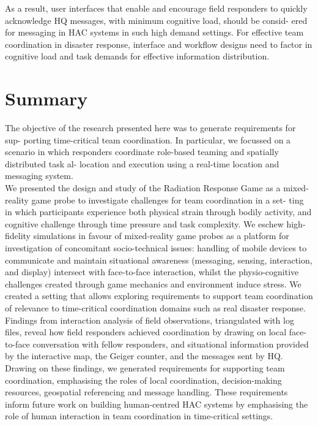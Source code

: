 As a result, user interfaces that enable and encourage field responders to quickly acknowledge HQ messages, with minimum cognitive load, should be consid- ered for messaging in HAC systems in such high demand settings. For effective team coordination in disaster response, interface and workflow designs need to factor in cognitive load and task demands for effective information distribution.\\


\section{Summary}
The objective of the research presented here was to generate requirements for sup- porting time-critical team coordination. In particular, we focussed on a scenario in which responders coordinate role-based teaming and spatially distributed task al- location and execution using a real-time location and messaging system.\\

We presented the design and study of the Radiation Response Game as a mixed-reality game probe to investigate challenges for team coordination in a set- ting in which participants experience both physical strain through bodily activity, and cognitive challenge through time pressure and task complexity. We eschew high-fidelity simulations in favour of mixed-reality game probes as a platform for investigation of concomitant socio-technical issues: handling of mobile devices to communicate and maintain situational awareness (messaging, sensing, interaction, and display) intersect with face-to-face interaction, whilst the physio-cognitive challenges created through game mechanics and environment induce stress. We created a setting that allows exploring requirements to support team coordination of relevance to time-critical coordination domains such as real disaster response.\\

Findings from interaction analysis of field observations, triangulated with log files, reveal how field responders achieved coordination by drawing on local face-to-face conversation with fellow responders, and situational information provided by the interactive map, the Geiger counter, and the messages sent by HQ. Drawing on these findings, we generated requirements for supporting team coordination, emphasising the roles of local coordination, decision-making resources, geospatial referencing and message handling. These requirements inform future work on building human-centred HAC systems by emphasising the role of human interaction in team coordination in time-critical settings.\\

